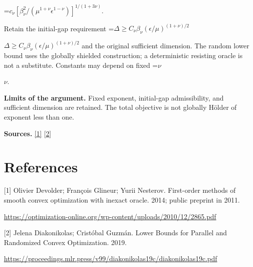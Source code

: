 \documentclass[10pt,a4paper]{article}
\newcommand{\AtlasMath}[1]{\par\begingroup\centering\setbox0=\hbox{$\displaystyle #1$}\ifdim\wd0>1.4\linewidth\typeout{ATLAS WIDE FORMULA: \the\wd0}\fi\ifdim\wd0>\linewidth\resizebox{\linewidth}{!}{\box0}\else\box0\fi\par\endgroup}
\newcommand{\AtlasInlineMath}[1]{\begingroup\setbox0=\hbox{$#1$}\ifdim\wd0>.4\linewidth\endgroup\AtlasMath{#1}\else\endgroup$#1$\fi}
\begin{document}
\AtlasMath{c_\nu[\beta_\nu^2/(\mu^{1+\nu}\epsilon^{1-\nu})]^{1/(1+3\nu)}.}

Retain the initial-gap requirement
\AtlasInlineMath{\Delta\ge C_\nu\beta_\nu(\epsilon/\mu)^{(1+\nu)/2}}
and the original sufficient dimension. The random lower bound uses the globally shielded construction; a deterministic resisting oracle is not a substitute. Constants may depend on fixed \AtlasInlineMath{\nu}.

\textbf{Limits of the argument.} Fixed exponent, initial-gap admissibility, and sufficient dimension are retained. The total objective is not globally Hölder of exponent less than one.

\textbf{Sources.} \href{https://optimization-online.org/wp-content/uploads/2010/12/2865.pdf}{[1]} \href{https://proceedings.mlr.press/v99/diakonikolas19c/diakonikolas19c.pdf}{[2]}

\section{References}
[1] Olivier Devolder; François Glineur; Yurii Nesterov. First-order methods of smooth convex optimization with inexact oracle. 2014; public preprint in 2011.

\url{https://optimization-online.org/wp-content/uploads/2010/12/2865.pdf}

[2] Jelena Diakonikolas; Cristóbal Guzmán. Lower Bounds for Parallel and Randomized Convex Optimization. 2019.

\url{https://proceedings.mlr.press/v99/diakonikolas19c/diakonikolas19c.pdf}
\end{document}
